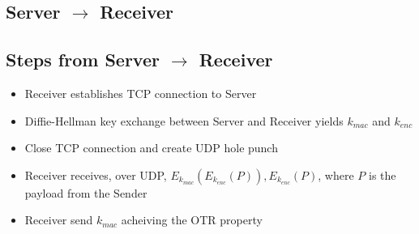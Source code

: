 \documentclass[11pt]{article}
\begin{document}
\subsection*{Server $\rightarrow$ Receiver}

\subsection*{Steps from Server $\rightarrow$ Receiver}
\begin{itemize}
  \item Receiver establishes TCP connection to Server
  \item Diffie-Hellman key exchange between Server and Receiver yields
  $k_{mac}$ and $k_{enc}$
  \item Close TCP connection and create UDP hole punch
  \item Receiver receives, over UDP,
    $E_{k_{mac}}\left(E_{k_{enc}}\left(P\right)\right),
    E_{k_{enc}}\left(P\right)$,
    where $P$ is the payload from the Sender
  \item Receiver send $k_{mac}$ acheiving the OTR property

\end{itemize}
\end{document}
